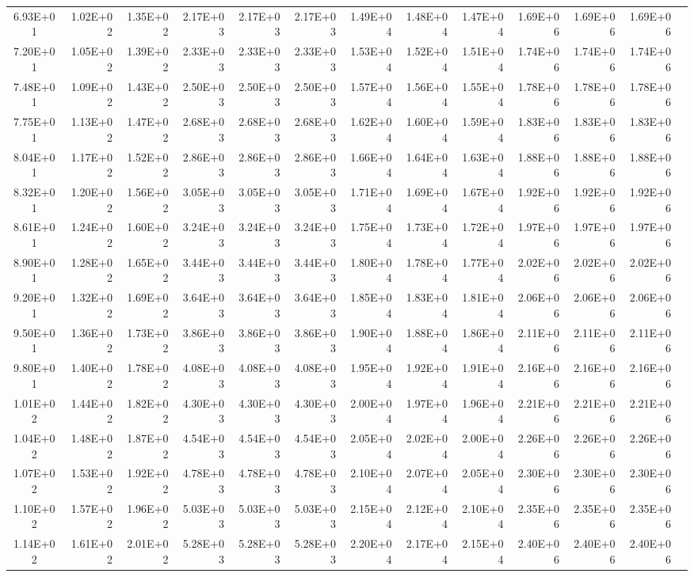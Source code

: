 \documentclass{article}
\begin{document}
\begin{table}
\begin{tabular}{crrr|rrr|rrr|rrr}
6.93E+01 & 1.02E+02 & 1.35E+02 & 2.17E+03 & 2.17E+03 & 2.17E+03 & 1.49E+04 & 1.48E+04 & 1.47E+04 & 1.69E+06 & 1.69E+06 & 1.69E+06 \\
7.20E+01 & 1.05E+02 & 1.39E+02 & 2.33E+03 & 2.33E+03 & 2.33E+03 & 1.53E+04 & 1.52E+04 & 1.51E+04 & 1.74E+06 & 1.74E+06 & 1.74E+06 \\
7.48E+01 & 1.09E+02 & 1.43E+02 & 2.50E+03 & 2.50E+03 & 2.50E+03 & 1.57E+04 & 1.56E+04 & 1.55E+04 & 1.78E+06 & 1.78E+06 & 1.78E+06 \\
7.75E+01 & 1.13E+02 & 1.47E+02 & 2.68E+03 & 2.68E+03 & 2.68E+03 & 1.62E+04 & 1.60E+04 & 1.59E+04 & 1.83E+06 & 1.83E+06 & 1.83E+06 \\
8.04E+01 & 1.17E+02 & 1.52E+02 & 2.86E+03 & 2.86E+03 & 2.86E+03 & 1.66E+04 & 1.64E+04 & 1.63E+04 & 1.88E+06 & 1.88E+06 & 1.88E+06 \\
8.32E+01 & 1.20E+02 & 1.56E+02 & 3.05E+03 & 3.05E+03 & 3.05E+03 & 1.71E+04 & 1.69E+04 & 1.67E+04 & 1.92E+06 & 1.92E+06 & 1.92E+06 \\
8.61E+01 & 1.24E+02 & 1.60E+02 & 3.24E+03 & 3.24E+03 & 3.24E+03 & 1.75E+04 & 1.73E+04 & 1.72E+04 & 1.97E+06 & 1.97E+06 & 1.97E+06 \\
8.90E+01 & 1.28E+02 & 1.65E+02 & 3.44E+03 & 3.44E+03 & 3.44E+03 & 1.80E+04 & 1.78E+04 & 1.77E+04 & 2.02E+06 & 2.02E+06 & 2.02E+06 \\
9.20E+01 & 1.32E+02 & 1.69E+02 & 3.64E+03 & 3.64E+03 & 3.64E+03 & 1.85E+04 & 1.83E+04 & 1.81E+04 & 2.06E+06 & 2.06E+06 & 2.06E+06 \\
9.50E+01 & 1.36E+02 & 1.73E+02 & 3.86E+03 & 3.86E+03 & 3.86E+03 & 1.90E+04 & 1.88E+04 & 1.86E+04 & 2.11E+06 & 2.11E+06 & 2.11E+06 \\
9.80E+01 & 1.40E+02 & 1.78E+02 & 4.08E+03 & 4.08E+03 & 4.08E+03 & 1.95E+04 & 1.92E+04 & 1.91E+04 & 2.16E+06 & 2.16E+06 & 2.16E+06 \\
1.01E+02 & 1.44E+02 & 1.82E+02 & 4.30E+03 & 4.30E+03 & 4.30E+03 & 2.00E+04 & 1.97E+04 & 1.96E+04 & 2.21E+06 & 2.21E+06 & 2.21E+06 \\
1.04E+02 & 1.48E+02 & 1.87E+02 & 4.54E+03 & 4.54E+03 & 4.54E+03 & 2.05E+04 & 2.02E+04 & 2.00E+04 & 2.26E+06 & 2.26E+06 & 2.26E+06 \\
1.07E+02 & 1.53E+02 & 1.92E+02 & 4.78E+03 & 4.78E+03 & 4.78E+03 & 2.10E+04 & 2.07E+04 & 2.05E+04 & 2.30E+06 & 2.30E+06 & 2.30E+06 \\
1.10E+02 & 1.57E+02 & 1.96E+02 & 5.03E+03 & 5.03E+03 & 5.03E+03 & 2.15E+04 & 2.12E+04 & 2.10E+04 & 2.35E+06 & 2.35E+06 & 2.35E+06 \\
1.14E+02 & 1.61E+02 & 2.01E+02 & 5.28E+03 & 5.28E+03 & 5.28E+03 & 2.20E+04 & 2.17E+04 & 2.15E+04 & 2.40E+06 & 2.40E+06 & 2.40E+06 \\

\end{tabular}
\end{table}
\end{document}

